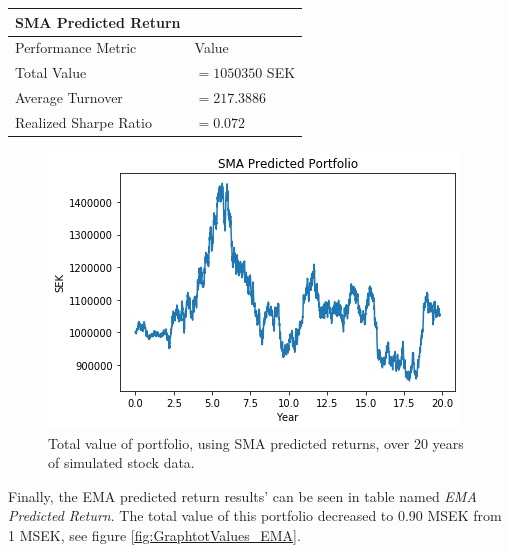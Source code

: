 \documentclass{LTHtwocol} %
\begin{document}
\begin{center}
 \begin{tabular}{||l l||} 
 \hline
 \textbf{SMA Predicted Return} & \\ [0.5ex] 
 \hline
 Performance Metric & Value\\ [0.5ex] 
 \hline\hline
 Total Value & $=1050350$ SEK \\ 
 \hline
 Average Turnover& $=217.3886$ \\
 \hline
 Realized Sharpe Ratio & $=0.072$ \\  [1ex] 
 \hline
\end{tabular}
\end{center}
\begin{figure}[h]
	\centering
	\includegraphics[width=0.8\columnwidth]{Pics/GraphtotValues_SMA.jpg}
	\caption{Total value of portfolio, using SMA predicted returns, over 20 years of simulated stock data.}
	\label{fig:GraphtotValues_SMA} 
\end{figure}

Finally, the EMA predicted return results' can be seen in table named \textit{EMA Predicted Return}. The total value of this portfolio decreased to 0.90 MSEK from 1 MSEK, see figure \ref{fig:GraphtotValues_EMA}.
\end{document}
